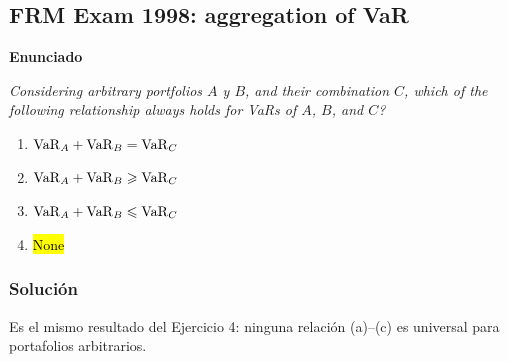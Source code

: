 ﻿\subsection{FRM Exam 1998: aggregation of VaR}

\textbf{Enunciado}

\emph{Considering arbitrary portfolios \(A\) y \(B\), and their combination \(C\),
which of the following relationship always holds for VaRs of \(A\), \(B\), and \(C\)?}
\begin{enumerate}[label=\alph*.]
\item \( \mathrm{VaR}_A+\mathrm{VaR}_B=\mathrm{VaR}_C\)
\item \( \mathrm{VaR}_A+\mathrm{VaR}_B\geqslant \mathrm{VaR}_C\)
\item \( \mathrm{VaR}_A+\mathrm{VaR}_B\leqslant \mathrm{VaR}_C\)
\item \hl{None}
\end{enumerate}

\subsubsection*{Solución}

Es el mismo resultado del Ejercicio 4: ninguna relación (a)--(c) es universal para portafolios arbitrarios.











